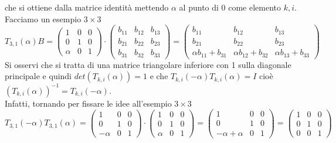 \documentclass[12pt,a4paper]{article}
\begin{document}
che si ottiene dalla matrice identità mettendo $\alpha$ al punto di 0 come elemento $k,i$.\\Facciamo un esempio $3\times 3$
\begin{equation*}
    T_{3,1}(\alpha)B=
    \begin{pmatrix}
        1 & 0 & 0 \\
        0 & 1 & 0 \\
        \alpha & 0 & 1
    \end{pmatrix} \cdot \begin{pmatrix}
        b_{11} & b_{12} & b_{13} \\
        b_{21} & b_{22} & b_{23} \\
        b_{31} & b_{32} & b_{33}
    \end{pmatrix}=\begin{pmatrix}
        b_{11} & b_{12} & b_{13} \\
        b_{21} & b_{22} & b_{23} \\
        \alpha b_{11}+b_{31} & \alpha b_{12}+b_{32} & \alpha b_{13}+b_{33}
    \end{pmatrix}
\end{equation*}
Si osservi che si tratta di una matrice triangolare inferiore con 1 sulla diagonale principale e quindi $det(T_{k,i}(\alpha))=1$ e che $T_{k,i}(-\alpha)T_{k,i}(\alpha)= I$ cioè $(T_{k,i}(\alpha))^{-1}=T_{k,i}(-\alpha)$.\\Infatti, tornando per fissare le idee all'esempio $3\times 3$
\begin{equation*}
    T_{3,1}(-\alpha)T_{3,1}(\alpha)=
    \begin{pmatrix}
        1 & 0 & 0 \\
        0 & 1 & 0 \\
        -\alpha & 0 & 1
    \end{pmatrix} \cdot \begin{pmatrix}
        1 & 0 & 0 \\
        0 & 1 & 0 \\
        \alpha & 0 & 1
    \end{pmatrix}=\begin{pmatrix}
        1 & 0 & 0 \\
        0 & 1 & 0 \\
        -\alpha+\alpha & 0 & 1
    \end{pmatrix}=\begin{pmatrix}
        1 & 0 & 0 \\
        0 & 1 & 0 \\
        0 & 0 & 1
    \end{pmatrix}
\end{equation*}
\end{document}
